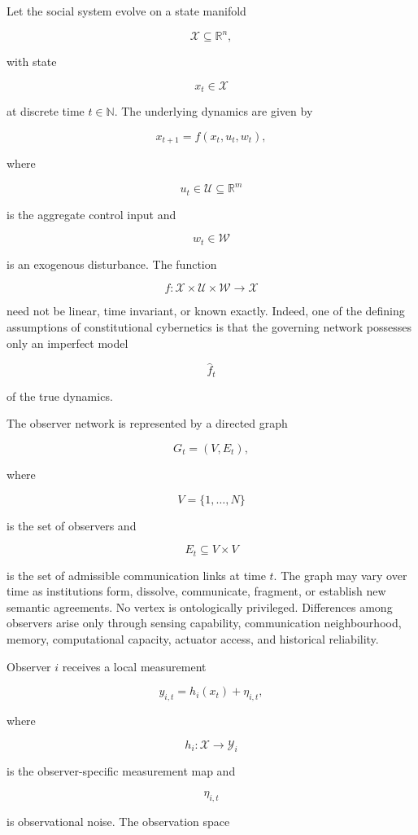 \documentclass[12pt,a4paper]{article}
\begin{document}
Let the social system evolve on a state manifold

\[
\mathcal{X}\subseteq\mathbb{R}^{n},
\]

with state

\[
x_t\in\mathcal{X}
\]

at discrete time \(t\in\mathbb{N}\). The underlying dynamics are given by

\[
x_{t+1}
=
f(x_t,u_t,w_t),
\]

where

\[
u_t\in\mathcal{U}\subseteq\mathbb{R}^{m}
\]

is the aggregate control input and

\[
w_t\in\mathcal{W}
\]

is an exogenous disturbance. The function

\[
f:\mathcal{X}\times\mathcal{U}\times\mathcal{W}\rightarrow\mathcal{X}
\]

need not be linear, time invariant, or known exactly. Indeed, one of the defining assumptions of constitutional cybernetics is that the governing network possesses only an imperfect model

\[
\hat{f}_t
\]

of the true dynamics.

The observer network is represented by a directed graph

\[
G_t=(V,E_t),
\]

where

\[
V=\{1,\dots,N\}
\]

is the set of observers and

\[
E_t\subseteq V\times V
\]

is the set of admissible communication links at time \(t\). The graph may vary over time as institutions form, dissolve, communicate, fragment, or establish new semantic agreements. No vertex is ontologically privileged. Differences among observers arise only through sensing capability, communication neighbourhood, memory, computational capacity, actuator access, and historical reliability.

Observer \(i\) receives a local measurement

\[
y_{i,t}
=
h_i(x_t)+\eta_{i,t},
\]

where

\[
h_i:\mathcal{X}\rightarrow\mathcal{Y}_i
\]

is the observer-specific measurement map and

\[
\eta_{i,t}
\]

is observational noise. The observation space
\end{document}
